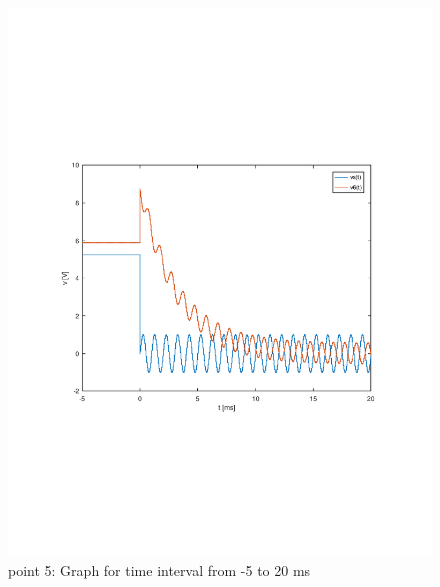 \begin{figure}[h] \centering
\includegraphics[width=0.9\linewidth]{theo5_tab.pdf}
\caption{point 5: Graph for time interval from -5 to 20 ms}
\label{fig:theo5}
\end{figure}






